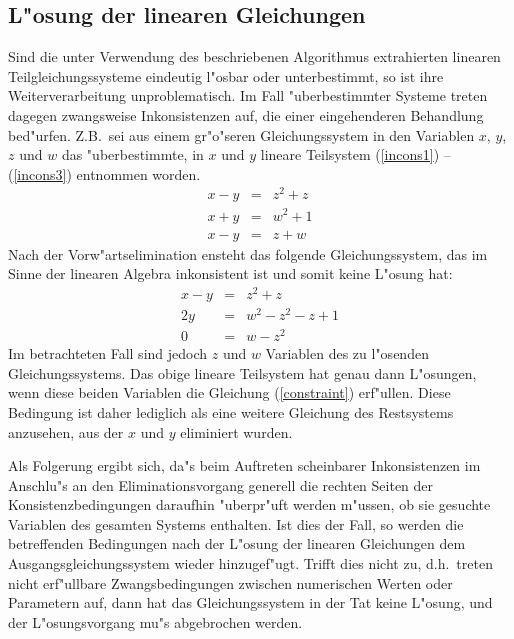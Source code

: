 \subsection{\label{LoesungLin}L"osung der linearen Gleichungen}

Sind die unter Verwendung des beschriebenen Algorithmus extrahierten
linearen Teilgleichungssysteme eindeutig l"osbar oder unterbestimmt, so ist
ihre Weiterverarbeitung unproblematisch. Im Fall "uberbestimmter Systeme
treten dagegen zwangsweise Inkonsistenzen auf, die einer eingehenderen
Behandlung bed"urfen. Z.B.\ sei aus einem gr"o"seren Gleichungssystem in den
Variablen $x$, $y$, $z$ und $w$ das "uberbestimmte, in $x$ und $y$ lineare
Teilsystem (\ref{incons1}) -- (\ref{incons3}) entnommen worden.
\begin{eqnarray}
x - y &=& z^2 + z  \label{incons1} \\
x + y &=& w^2 +1   \label{incons2} \\
x - y &=& z + w    \label{incons3} 
\end{eqnarray}
Nach der Vorw"artselimination ensteht das folgende Gleichungssystem, das im
Sinne der linearen Algebra inkonsistent ist und somit keine L"osung hat:
\begin{eqnarray}
x - y &=& z^2 + z           \\
   2y &=& w^2 - z^2 - z + 1 \\
    0 &=& w - z^2           \label{constraint}        
\end{eqnarray}
Im betrachteten Fall sind jedoch $z$ und $w$ Variablen des zu l"osenden
Gleichungssystems. Das obige lineare Teilsystem hat genau dann
L"osungen, wenn diese beiden Variablen die Gleichung (\ref{constraint})
erf"ullen. Diese Bedingung ist daher lediglich als eine weitere
Gleichung des Restsystems anzusehen, aus der $x$ und $y$ eliminiert
wurden.

Als Folgerung ergibt sich, da"s beim Auftreten scheinbarer Inkonsistenzen im
Anschlu"s an den Eliminationsvorgang generell die rechten Seiten der
Konsistenzbedingungen daraufhin "uberpr"uft werden m"ussen, ob sie gesuchte
Variablen des gesamten Systems enthalten. Ist dies der Fall, so werden die
betreffenden Bedingungen nach der L"osung der linearen Gleichungen dem
Ausgangsgleichungssystem wieder hinzugef"ugt. Trifft dies nicht zu, d.h.\
treten nicht erf"ullbare Zwangsbedingungen zwischen numerischen Werten oder
Parametern auf, dann hat das Gleichungssystem in der Tat keine L"osung, und
der L"osungsvorgang mu"s abgebrochen werden.


